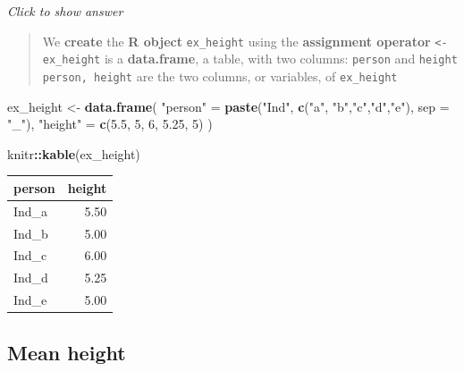 \documentclass[
]{book}
\newenvironment{Shaded}{\begin{snugshade}}{\end{snugshade}}
\newcommand{\AttributeTok}[1]{\textcolor[rgb]{0.13,0.29,0.53}{#1}}
\newcommand{\DecValTok}[1]{\textcolor[rgb]{0.00,0.00,0.81}{#1}}
\newcommand{\FloatTok}[1]{\textcolor[rgb]{0.00,0.00,0.81}{#1}}
\newcommand{\FunctionTok}[1]{\textcolor[rgb]{0.13,0.29,0.53}{\textbf{#1}}}
\newcommand{\NormalTok}[1]{#1}
\newcommand{\OtherTok}[1]{\textcolor[rgb]{0.56,0.35,0.01}{#1}}
\newcommand{\SpecialCharTok}[1]{\textcolor[rgb]{0.81,0.36,0.00}{\textbf{#1}}}
\newcommand{\StringTok}[1]{\textcolor[rgb]{0.31,0.60,0.02}{#1}}
\begin{document}
\emph{Click to show answer}

\begin{quote}
We \textbf{create} the \textbf{R object} \texttt{ex\_height} using the \textbf{assignment operator} \texttt{\textless{}-}
\texttt{ex\_height} is a \textbf{data.frame}, a table, with two columns: \texttt{person} and \texttt{height}
\texttt{person,\ height} are the two columns, or variables, of \texttt{ex\_height}
\end{quote}

\begin{Shaded}
\begin{Highlighting}[]
\NormalTok{ex\_height }\OtherTok{\textless{}{-}} \FunctionTok{data.frame}\NormalTok{(}
  \StringTok{"person"} \OtherTok{=} \FunctionTok{paste}\NormalTok{(}\StringTok{"Ind"}\NormalTok{, }
                   \FunctionTok{c}\NormalTok{(}\StringTok{"a"}\NormalTok{, }\StringTok{"b"}\NormalTok{,}\StringTok{"c"}\NormalTok{,}\StringTok{"d"}\NormalTok{,}\StringTok{"e"}\NormalTok{), }
                   \AttributeTok{sep =} \StringTok{"\_"}\NormalTok{),}
  \StringTok{"height"} \OtherTok{=} \FunctionTok{c}\NormalTok{(}\FloatTok{5.5}\NormalTok{, }\DecValTok{5}\NormalTok{, }\DecValTok{6}\NormalTok{, }\FloatTok{5.25}\NormalTok{, }\DecValTok{5}\NormalTok{)}
\NormalTok{)}
\end{Highlighting}
\end{Shaded}

\begin{Shaded}
\begin{Highlighting}[]
\NormalTok{knitr}\SpecialCharTok{::}\FunctionTok{kable}\NormalTok{(ex\_height)}
\end{Highlighting}
\end{Shaded}

\begin{tabular}{l|r}
\hline
person & height\\
\hline
Ind\_a & 5.50\\
\hline
Ind\_b & 5.00\\
\hline
Ind\_c & 6.00\\
\hline
Ind\_d & 5.25\\
\hline
Ind\_e & 5.00\\
\hline
\end{tabular}

\hypertarget{mean-height}{%
\subsection{Mean height}\label{mean-height}}
\end{document}
